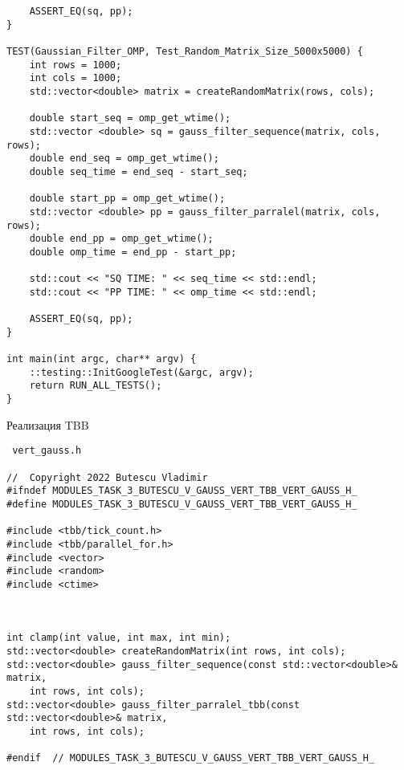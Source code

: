 \documentclass{report}
\begin{document}
\begin{lstlisting}
    ASSERT_EQ(sq, pp);
}

TEST(Gaussian_Filter_OMP, Test_Random_Matrix_Size_5000x5000) {
    int rows = 1000;
    int cols = 1000;
    std::vector<double> matrix = createRandomMatrix(rows, cols);

    double start_seq = omp_get_wtime();
    std::vector <double> sq = gauss_filter_sequence(matrix, cols, rows);
    double end_seq = omp_get_wtime();
    double seq_time = end_seq - start_seq;

    double start_pp = omp_get_wtime();
    std::vector <double> pp = gauss_filter_parralel(matrix, cols, rows);
    double end_pp = omp_get_wtime();
    double omp_time = end_pp - start_pp;

    std::cout << "SQ TIME: " << seq_time << std::endl;
    std::cout << "PP TIME: " << omp_time << std::endl;

    ASSERT_EQ(sq, pp);
}

int main(int argc, char** argv) {
    ::testing::InitGoogleTest(&argc, argv);
    return RUN_ALL_TESTS();
}

\end{lstlisting}
Реализация TBB
\begin{lstlisting}
 vert_gauss.h
 
//  Copyright 2022 Butescu Vladimir
#ifndef MODULES_TASK_3_BUTESCU_V_GAUSS_VERT_TBB_VERT_GAUSS_H_
#define MODULES_TASK_3_BUTESCU_V_GAUSS_VERT_TBB_VERT_GAUSS_H_

#include <tbb/tick_count.h>
#include <tbb/parallel_for.h>
#include <vector>
#include <random>
#include <ctime>



int clamp(int value, int max, int min);
std::vector<double> createRandomMatrix(int rows, int cols);
std::vector<double> gauss_filter_sequence(const std::vector<double>& matrix,
    int rows, int cols);
std::vector<double> gauss_filter_parralel_tbb(const std::vector<double>& matrix,
    int rows, int cols);

#endif  // MODULES_TASK_3_BUTESCU_V_GAUSS_VERT_TBB_VERT_GAUSS_H_

\end{lstlisting}
\end{document}
